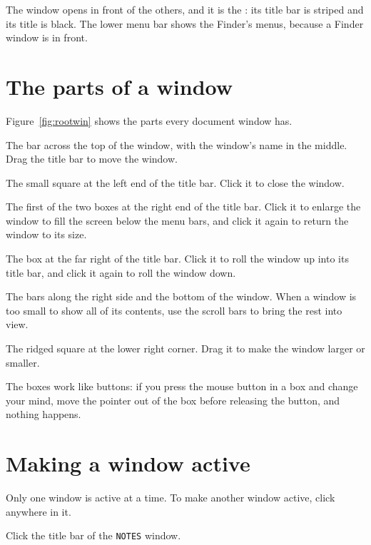 
The window opens in front of the others, and it is the : its title bar is striped and its title is black.  The lower menu
bar shows the Finder's menus, because a Finder window is in front.

\section{The parts of a window}
Figure~\ref{fig:rootwin} shows the parts every document window has.

The bar across the top of the window, with the
window's name in the middle.  Drag the title bar to move the window.

The small square at the left end of the title bar.
Click it to close the window.

The first of the two boxes at the right end of the title
bar.  Click it to enlarge the window to fill the screen below the menu
bars, and click it again to return the window to its size.

The box at the far right of the title bar.  Click it
to roll the window up into its title bar, and click it again to roll the
window down.

The bars along the right side and the bottom of the
window.  When a window is too small to show all of its contents, use the
scroll bars to bring the rest into view.

The ridged square at the lower right corner.  Drag it to
make the window larger or smaller.

The boxes work like buttons: if you press the mouse button in a box and
change your mind, move the pointer out of the box before releasing the
button, and nothing happens.

\section{Making a window active}
Only one window is active at a time.  To make another window active, click
anywhere in it.
\begin{TaskSteps}
\Step Click the title bar of the \texttt{NOTES} window.
\end{TaskSteps}

